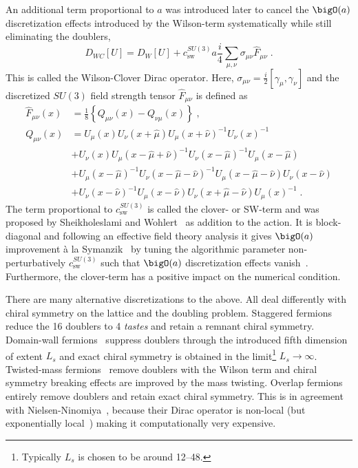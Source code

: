An additional term proportional to $a$ was introduced later to cancel the $\bigO(a)$ discretization effects introduced by the Wilson-term systematically while still eliminating the doublers,
\begin{equation} \label{eq:dirac:wilson:clover}
D_{WC}[U] = D_W[U] + c_\mathrm{sw}^{SU(3)} a \frac{i}{4} \sum_{\mu, \nu} \sigma_{\mu \nu} \hat{F}_{\mu \nu} \;.
\end{equation}
This is called the Wilson-Clover Dirac operator.
Here, $\sigma_{\mu \nu} = \frac{i}{2} \left[\gamma_{\mu}, \gamma_{\nu}\right]$ and the discretized $SU(3)$ field strength tensor $\hat{F}_{\mu \nu}$ is defined as
\begin{equation}
\begin{aligned} \label{eq:intro:clover}
\hat{F}_{\mu \nu}(x) &= \frac{1}{8} \left\{
    Q_{\mu \nu}(x) - Q_{\nu \mu}(x)
\right\} \;, \\
Q_{\mu \nu}(x)
&= U_{\mu}(x)
   U_{\nu}(x+\hat{\mu})
   U_{\mu}(x+\hat{\nu})^{-1}
   U_{\nu}(x)^{-1} \\
&+ U_{\nu}(x)
   U_{\mu}(x-\hat{\mu}+\hat{\nu})^{-1}
   U_{\nu}(x-\hat{\mu})^{-1}
   U_{\mu}(x-\hat{\mu}) \\
&+ U_{\mu}(x-\hat{\mu})^{-1}
   U_{\nu}(x-\hat{\mu}-\hat{\nu})^{-1}
   U_{\mu}(x-\hat{\mu}-\hat{\nu})
   U_{\nu}(x-\hat{\nu}) \\
&+ U_{\nu}(x-\hat{\nu})^{-1}
   U_{\mu}(x-\hat{\nu})
   U_{\nu}(x+\hat{\mu}-\hat{\nu})
   U_{\mu}(x)^{-1} \;.
\end{aligned}
\end{equation}
The term proportional to $c_\mathrm{sw}^{SU(3)}$ is called the clover- or SW-term and was proposed by Sheikholeslami and Wohlert~\cite{sw1985} as addition to the action.
It is block-diagonal and following an effective field theory analysis it gives $\bigO(a)$ improvement à la Symanzik~\cite{symanzik1982,SYMANZIK1983} by tuning the algorithmic parameter non-perturbatively $c_\mathrm{sw}^{SU(3)}$ such that $\bigO(a)$ discretization effects vanish~\cite{LUSCHER1996365}.
Furthermore, the clover-term has a positive impact on the numerical condition.

There are many alternative discretizations to the above.
All deal differently with chiral symmetry on the lattice and the doubling problem.
Staggered fermions~\cite{PhysRevD.11.395} reduce the \num{16} doublers to \num{4} \emph{tastes} and retain a remnant  chiral symmetry.
Domain-wall fermions~\cite{Kaplan:1992bt,Shamir:1993zy} suppress doublers through the introduced fifth dimension of extent $L_s$ and exact chiral symmetry is obtained in the limit\footnote{Typically $L_s$ is chosen to be around \numrange{12}{48}.} $L_s \to \infty$.
Twisted-mass fermions~\cite{Frezzotti:2000nk} remove doublers with the Wilson term and chiral symmetry breaking effects are improved by the mass twisting.
Overlap fermions~\cite{Neuberger:1997fp,Neuberger:1998wv} entirely remove doublers and retain exact chiral symmetry.
This is in agreement with Nielsen-Ninomiya~\cite{Nielsen:1980rz,Nielsen:1981xu}, because their Dirac operator is non-local (but exponentially local~\cite{Hernandez:1998et,Boyle:2016imm}) making it computationally very expensive.

